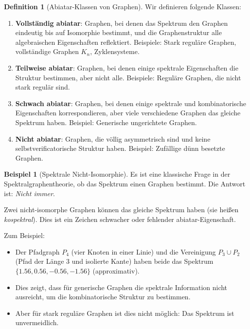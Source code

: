 \documentclass[a4paper,12pt]{article}
\theoremstyle{definition}
\newtheorem{definition}{Definition}
\newtheorem{beispiel}{Beispiel}
\begin{document}
\begin{definition}[Abiatar-Klassen von Graphen]
Wir definieren folgende Klassen:

\begin{enumerate}
\item \textbf{Vollständig abiatar}: Graphen, bei denen das Spektrum den Graphen eindeutig bis auf Isomorphie bestimmt, und die Graphenstruktur alle algebraischen Eigenschaften reflektiert. Beispiele: Stark reguläre Graphen, vollständige Graphen $K_n$, Zyklensysteme.

\item \textbf{Teilweise abiatar}: Graphen, bei denen einige spektrale Eigenschaften die Struktur bestimmen, aber nicht alle. Beispiele: Reguläre Graphen, die nicht stark regulär sind.

\item \textbf{Schwach abiatar}: Graphen, bei denen einige spektrale und kombinatorische Eigenschaften korrespondieren, aber viele verschiedene Graphen das gleiche Spektrum haben. Beispiel: Generische ungerichtete Graphen.

\item \textbf{Nicht abiatar}: Graphen, die völlig asymmetrisch sind und keine selbstverificatorische Struktur haben. Beispiel: Zufällige dünn besetzte Graphen.
\end{enumerate}
\end{definition}

\begin{beispiel}[Spektrale Nicht-Isomorphie]
Es ist eine klassische Frage in der Spektralgraphentheorie, ob das Spektrum einen Graphen bestimmt. Die Antwort ist: \textit{Nicht immer}.

Zwei nicht-isomorphe Graphen können das gleiche Spektrum haben (sie heißen \textit{kospektral}). Dies ist ein Zeichen schwacher oder fehlender abiatar-Eigenschaft.

Zum Beispiel:
\begin{itemize}
\item Der Pfadgraph $P_4$ (vier Knoten in einer Linie) und die Vereinigung $P_3 \cup P_2$ (Pfad der Länge 3 und isolierte Kante) haben beide das Spektrum $\{1.56, 0.56, -0.56, -1.56\}$ (approximativ).

\item Dies zeigt, dass für generische Graphen die spektrale Information nicht ausreicht, um die kombinatorische Struktur zu bestimmen.

\item Aber für stark reguläre Graphen ist dies nicht möglich: Das Spektrum ist unvermeidlich.
\end{itemize}
\end{beispiel}
\end{document}
